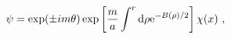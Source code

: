 \begin{equation}
\psi=\exp(\pm im\theta)\exp\left[\frac{m}{a} \int^r{\rm
d}\rho{\rm e}^{-B(\rho)/2}\right]\chi(x)~,
\end{equation}

